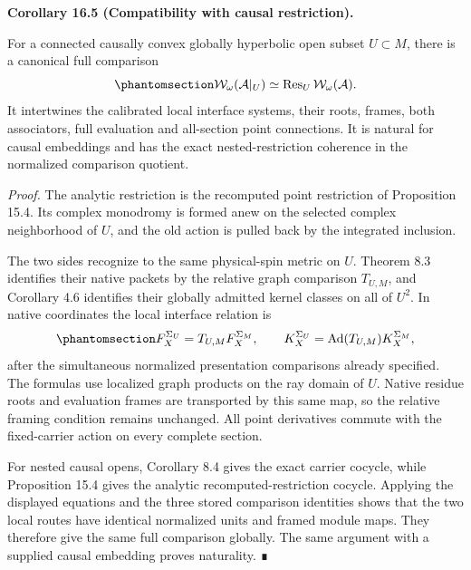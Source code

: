 \documentclass[
  english,
  11pt,
  reqno]{amsart}
\makeatletter
\newcommand{\pandocstatementheading}[1]{%
  \par\addpenalty{\@beginparpenalty}%
  \addvspace{.5\baselineskip plus .2\baselineskip minus .2\baselineskip}%
  {\normalfont\bfseries #1\par}%
  \nobreak\@afterindenttrue\@afterheading
}
\makeatother
\begin{document}
\pandocstatementheading{\protect{}\label{cor:analytic-wave-causal-restriction}Corollary 16.5 (Compatibility with causal restriction).}

For a connected causally convex globally hyperbolic open subset
\(U\subset M\), there is a canonical full comparison
\begin{equation}\protect\phantomsection\label{eq:analytic-wave-causal-restriction}{
\mathcal W_\omega(\mathcal A|_U)
\simeq
\operatorname{Res}_U\mathcal W_\omega(\mathcal A).
}\end{equation} It intertwines the calibrated local interface systems,
their roots, frames, both associators, full evaluation and all-section
point connections. It is natural for causal embeddings and has the exact
nested-restriction coherence in the normalized comparison quotient.

\emph{Proof.} The analytic restriction is the recomputed point
restriction of Proposition 15.4. Its complex monodromy is formed anew on
the selected complex neighborhood of \(U\), and the old action is pulled
back by the integrated inclusion.

The two sides recognize to the same physical-spin metric on \(U\).
Theorem 8.3 identifies their native packets by the relative graph
comparison \(T_{U,M}\), and Corollary 4.6 identifies their globally
admitted kernel classes on all of \(U^2\). In native coordinates the
local interface relation is
\begin{equation}\protect\phantomsection\label{eq:analytic-interface-relative-carrier}{
F_X^{\Sigma_U}
=T_{U,M}F_X^{\Sigma_M},
\qquad
K_X^{\Sigma_U}
=\operatorname{Ad}(T_{U,M})K_X^{\Sigma_M},
}\end{equation} after the simultaneous normalized presentation
comparisons already specified. The formulas use localized graph products
on the ray domain of \(U\). Native residue roots and evaluation frames
are transported by this same map, so the relative framing condition
remains unchanged. All point derivatives commute with the fixed-carrier
action on every complete section.

For nested causal opens, Corollary 8.4 gives the exact carrier cocycle,
while Proposition 15.4 gives the analytic recomputed-restriction
cocycle. Applying the displayed equations and the three stored
comparison identities shows that the two local routes have identical
normalized units and framed module maps. They therefore give the same
full comparison globally. The same argument with a supplied causal
embedding proves naturality. ∎
\end{document}
